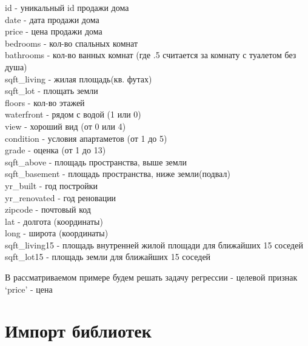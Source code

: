 \documentclass[11pt]{report}
\begin{document}
id - уникальный id продажи дома\\
date - дата продажи дома\\
price - цена продажи дома\\
bedrooms - кол-во спальных комнат\\
bathrooms - кол-во ванных комнат (где .5 считается за комнату с туалетом
без душа)\\
sqft\_living - жилая площадь(кв. футах)\\
sqft\_lot - площать земли\\
floors - кол-во этажей\\
waterfront - рядом с водой (1 или 0)\\
view - хороший вид (от 0 или 4)\\
condition - условия апартаметов (от 1 до 5)\\
grade - оценка (от 1 до 13)\\
sqft\_above - площадь пространства, выше земли\\
sqft\_basement - площадь пространства, ниже земли(подвал)\\
yr\_built - год постройки\\
yr\_renovated - год реновации\\
zipcode - почтовый код\\
lat - долгота (координаты)\\
long - широта (координаты)\\
sqft\_living15 - площадь внутренней жилой площади для ближайших 15
соседей\\
sqft\_lot15 - площадь земли для ближайших 15 соседей

В рассматриваемом примере будем решать задачу регрессии - целевой
признак `price' - цена

\section{Импорт библиотек}
\end{document}
